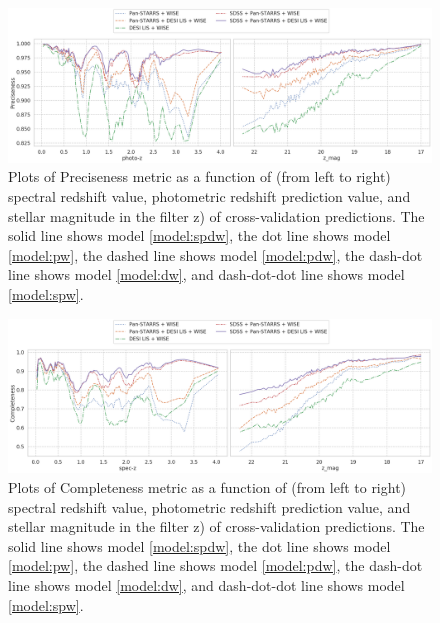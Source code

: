 \documentclass[fleqn,usenatbib]{mnras}
\begin{document}
\begin{figure}
    \centering
    \includegraphics[width=0.9\linewidth]{images/metrics-prec-cv2.png}
    \caption{Plots of Preciseness metric as a function of (from left to right) spectral redshift value, photometric redshift prediction value, and stellar magnitude in the filter z) of cross-validation predictions. The solid line shows model \ref{model:spdw}, the dot line shows model \ref{model:pw}, the dashed line shows model \ref{model:pdw}, the dash-dot line shows model \ref{model:dw}, and dash-dot-dot line shows model \ref{model:spw}.}
    \label{fig:metrics-prec-cv2}
\end{figure}

\begin{figure}
    \centering
    \includegraphics[width=0.9\linewidth]{images/metrics-comp-cv2.png}
    \caption{Plots of Completeness metric as a function of (from left to right) spectral redshift value, photometric redshift prediction value, and stellar magnitude in the filter z) of cross-validation predictions. The solid line shows model \ref{model:spdw}, the dot line shows model \ref{model:pw}, the dashed line shows model \ref{model:pdw}, the dash-dot line shows model \ref{model:dw}, and dash-dot-dot line shows model \ref{model:spw}.}
    \label{fig:metrics-comp-cv2}
\end{figure}
\end{document}
